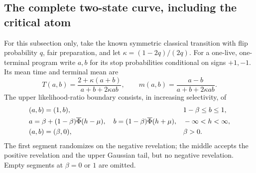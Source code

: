 \subsection{The complete two-state curve, including the critical atom}
For this subsection only, take the known symmetric classical transition with flip probability $q$, fair preparation, and let $\kappa=(1-2q)/(2q)$. For a one-live, one-terminal program write $a,b$ for its stop probabilities conditional on signs $+1,-1$. Its mean time and terminal mean are
\begin{equation}\label{eq:two-state-occupation}
 T(a,b)=\frac{2+\kappa(a+b)}{a+b+2\kappa ab},\qquad
 m(a,b)=\frac{a-b}{a+b+2\kappa ab}.
\end{equation}
The upper likelihood-ratio boundary consists, in increasing selectivity, of
\begin{align}
 &(a,b)=(1,b),&&1-\beta\le b\le1,\label{eq:roc}\\
 &a=\beta+(1-\beta)\overline\Phi(h-\mu),\quad
 b=(1-\beta)\overline\Phi(h+\mu),&&-\infty<h<\infty,\notag\\
 &(a,b)=(\beta,0),&&\beta>0.\notag
\end{align}
The first segment randomizes on the negative revelation; the middle accepts the positive revelation and the upper Gaussian tail, but no negative revelation. Empty segments at $\beta=0$ or $1$ are omitted.

